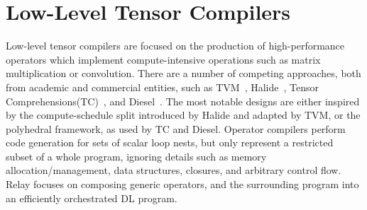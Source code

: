 

\section{Low-Level Tensor Compilers}
Low-level tensor compilers are focused on the production
    of high-performance operators which implement compute-intensive
    operations such as matrix multiplication or convolution.
There are a number of competing approaches,
    both from academic and commercial entities, such as
    TVM~\citep{tvm_osdi18}, Halide~\citep{halide}, Tensor Comprehensions(TC)~\citep{tensor_comprehensions},
    and Diesel~\citep{diesel}.
The most notable designs are either inspired by the
    compute-schedule split introduced by Halide
    and adapted by TVM, or the polyhedral framework,
    as used by TC and Diesel.
Operator compilers perform code generation for sets of scalar loop nests,
    but only represent a restricted subset of a whole program, ignoring details such as
    memory allocation/management, data structures, closures, and arbitrary control flow.
Relay focuses on composing generic operators, and the surrounding program
    into an efficiently orchestrated DL program.

